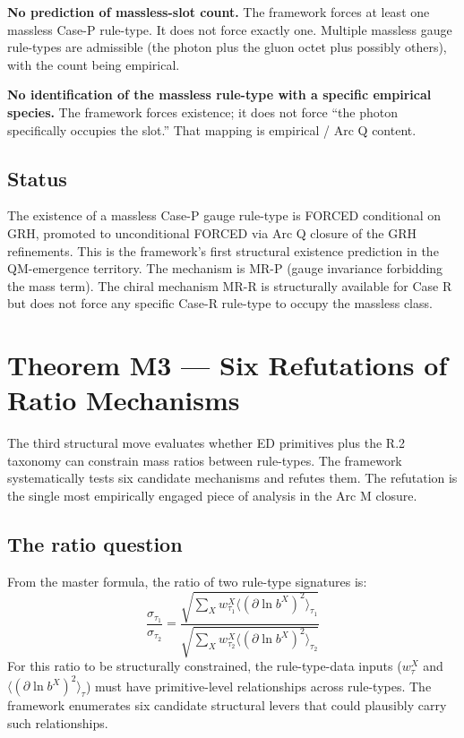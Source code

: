 \documentclass[11pt,a4paper]{article}
\begin{document}
\textbf{No prediction of massless-slot count.} The framework forces at least one massless Case-P rule-type. It does not force exactly one. Multiple massless gauge rule-types are admissible (the photon plus the gluon octet plus possibly others), with the count being empirical.

\textbf{No identification of the massless rule-type with a specific empirical species.} The framework forces existence; it does not force ``the photon specifically occupies the slot.'' That mapping is empirical / Arc Q content.

\subsection{Status}

The existence of a massless Case-P gauge rule-type is FORCED conditional on GRH, promoted to unconditional FORCED via Arc Q closure of the GRH refinements. This is the framework's first structural existence prediction in the QM-emergence territory. The mechanism is MR-P (gauge invariance forbidding the mass term). The chiral mechanism MR-R is structurally available for Case R but does not force any specific Case-R rule-type to occupy the massless class.

\section{Theorem M3 --- Six Refutations of Ratio Mechanisms}

The third structural move evaluates whether ED primitives plus the R.2 taxonomy can constrain mass ratios between rule-types. The framework systematically tests six candidate mechanisms and refutes them. The refutation is the single most empirically engaged piece of analysis in the Arc M closure.

\subsection{The ratio question}

From the master formula, the ratio of two rule-type signatures is:
\[
\frac{\sigma_{\tau_1}}{\sigma_{\tau_2}} = \frac{\sqrt{\sum_X w_{\tau_1}^X \langle(\partial\ln b^X)^2\rangle_{\tau_1}}}{\sqrt{\sum_X w_{\tau_2}^X \langle(\partial\ln b^X)^2\rangle_{\tau_2}}}
\]
For this ratio to be structurally constrained, the rule-type-data inputs ($w_\tau^X$ and $\langle(\partial\ln b^X)^2\rangle_\tau$) must have primitive-level relationships across rule-types. The framework enumerates six candidate structural levers that could plausibly carry such relationships.
\end{document}
